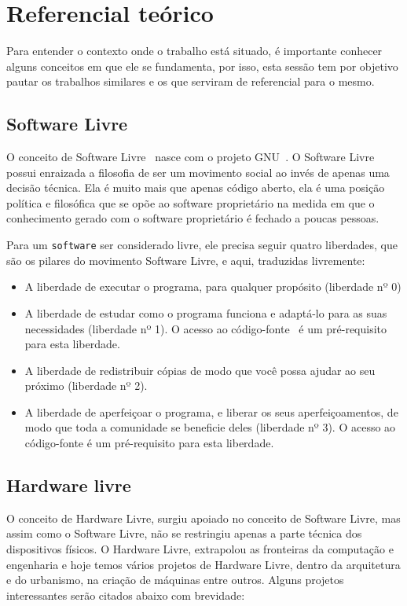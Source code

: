 \documentclass[final,12pt, times, 5p, twocolumn]{elsarticle}
\begin{document}
\section{Referencial teórico}

Para entender o contexto onde o trabalho está situado, é importante conhecer alguns conceitos em que ele se fundamenta, por isso, esta sessão tem por objetivo pautar os trabalhos similares e os que serviram de referencial para o mesmo.

\subsection{Software Livre}
O conceito de Software Livre~\cite{softwareLivre} nasce com o projeto GNU~\cite{GNU}. O Software Livre possui enraizada a filosofia de ser um movimento social ao invés de apenas uma decisão técnica. Ela é muito mais que apenas código aberto, ela é uma posição política e filosófica que se opõe ao software proprietário na medida em que o conhecimento gerado com o software proprietário é fechado a poucas pessoas.

Para um \texttt{software} ser considerado livre, ele precisa seguir quatro liberdades, que são os pilares do movimento Software Livre, e aqui, traduzidas livremente:

\begin{itemize}
  \item A liberdade de executar o programa, para qualquer propósito (liberdade nº 0)
  \item A liberdade de estudar como o programa funciona e adaptá-lo para as suas necessidades (liberdade nº 1). O acesso ao código-fonte~\cite{codigoFonte} é um pré-requisito para esta liberdade.
  \item A liberdade de redistribuir cópias de modo que você possa ajudar ao seu próximo (liberdade nº 2).
  \item A liberdade de aperfeiçoar o programa, e liberar os seus aperfeiçoamentos, de modo que toda a comunidade se beneficie deles (liberdade nº 3). O acesso ao código-fonte é um pré-requisito para esta liberdade.
\end{itemize}

\subsection{Hardware livre}
O conceito de Hardware Livre, surgiu apoiado no conceito de Software Livre, mas assim como o Software Livre, não se restringiu apenas a parte técnica dos dispositivos físicos. O Hardware Livre, extrapolou as fronteiras da computação e engenharia e hoje temos vários projetos de Hardware Livre, dentro da arquitetura e do urbanismo, na criação de máquinas entre outros. Alguns projetos interessantes serão citados abaixo com brevidade:
\end{document}
